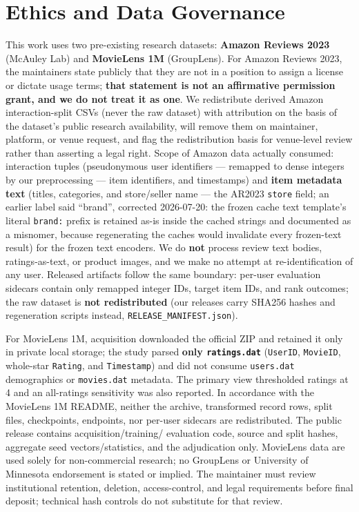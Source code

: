 \section{Ethics and Data Governance}\label{sec:10}

This work uses two pre-existing research datasets: \textbf{Amazon Reviews 2023}
\citep{hou2024blair} (McAuley Lab) and \textbf{MovieLens 1M}
\citep{harper2015movielens} (GroupLens). For Amazon Reviews 2023, the maintainers
state publicly that they are not in a position to assign a license or dictate usage
terms; \textbf{that statement is not an affirmative permission grant, and we do not
treat it as one}. We redistribute derived Amazon interaction-split CSVs (never the raw
dataset) with attribution on the basis of the dataset's public research availability,
will remove them on maintainer, platform, or venue request, and flag the redistribution
basis for venue-level review rather than asserting a legal right. Scope of Amazon data
actually consumed: interaction tuples (pseudonymous user identifiers --- remapped to dense
integers by our preprocessing --- item identifiers, and timestamps) and \textbf{item metadata text}
(titles, categories, and store/seller name --- the AR2023 \texttt{store} field; an earlier label said ``brand'', corrected 2026-07-20: the frozen cache text template's literal \texttt{brand:} prefix is retained as-is inside the cached strings and documented as a misnomer, because regenerating the caches would invalidate every frozen-text result) for the frozen text encoders. We do \textbf{not} process review text
bodies, ratings-as-text, or product images, and we make no attempt at re-identification of any
user. Released artifacts follow the same boundary: per-user evaluation sidecars contain only
remapped integer IDs, target item IDs, and rank outcomes; the raw dataset is \textbf{not
redistributed} (our releases carry SHA256 hashes and regeneration scripts instead,
\texttt{RELEASE\_MANIFEST.json}).

For MovieLens 1M, acquisition downloaded the official ZIP and retained it only in
private local storage; the study parsed \textbf{only \texttt{ratings.dat}}
(\texttt{UserID}, \texttt{MovieID}, whole-star \texttt{Rating}, and
\texttt{Timestamp}) and did not consume \texttt{users.dat} demographics or
\texttt{movies.dat} metadata. The primary view thresholded ratings at 4 and an
all-ratings sensitivity was also reported. In accordance with the MovieLens 1M README,
neither the archive, transformed record rows, split files, checkpoints, endpoints, nor
per-user sidecars are redistributed. The public release contains acquisition/training/
evaluation code, source and split hashes, aggregate seed vectors/statistics, and the
adjudication only. MovieLens data are used solely for non-commercial research; no
GroupLens or University of Minnesota endorsement is stated or implied. The maintainer
must review institutional retention, deletion, access-control, and legal requirements
before final deposit; technical hash controls do not substitute for that review.

